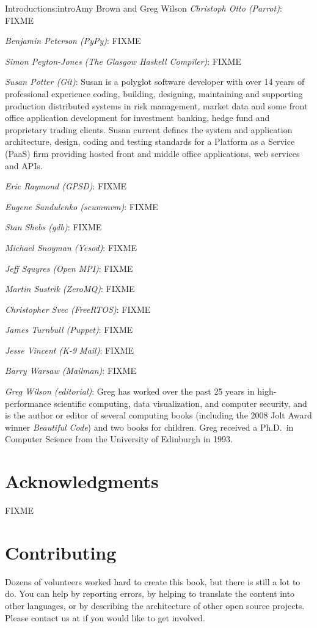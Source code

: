 \begin{aosachapter}{Introduction}{s:intro}{Amy Brown and Greg Wilson}
\emph{Christoph Otto (Parrot)}: FIXME

\emph{Benjamin Peterson (PyPy)}: FIXME

\emph{Simon Peyton-Jones (The Glasgow Haskell Compiler)}: FIXME

\emph{Susan Potter (Git)}: Susan is a polyglot software developer with
over 14 years of professional experience coding, building, designing,
maintaining and supporting production distributed systems in risk management,
market data and some front office application development for investment
banking, hedge fund and proprietary trading clients. Susan current defines the
system and application architecture, design, coding and testing standards for
a Platform as a Service (PaaS) firm providing hosted front and middle office
applications, web services and APIs.

\emph{Eric Raymond (GPSD)}: FIXME

\emph{Eugene Sandulenko (scummvm)}: FIXME

\emph{Stan Shebs (gdb)}: FIXME

\emph{Michael Snoyman (Yesod)}: FIXME

\emph{Jeff Squyres (Open MPI)}: FIXME

\emph{Martin Sustrik (ZeroMQ)}: FIXME

\emph{Christopher Svec (FreeRTOS)}: FIXME

\emph{James Turnbull (Puppet)}: FIXME

\emph{Jesse Vincent (K-9 Mail)}: FIXME

\emph{Barry Warsaw (Mailman)}: FIXME

\emph{Greg Wilson (editorial)}: Greg has worked over the past 25 years
in high-performance scientific computing, data visualization, and
computer security, and is the author or editor of several computing
books (including the 2008 Jolt Award winner \emph{Beautiful Code}) and
two books for children.  Greg received a Ph.D.\ in Computer Science
from the University of Edinburgh in 1993.

\section*{Acknowledgments}

FIXME

\section*{Contributing}

Dozens of volunteers worked hard to create this book, but there is
still a lot to do.  You can help by reporting errors, by helping to
translate the content into other languages, or by describing the
architecture of other open source projects.  Please contact us at
 if you would like to get involved.

\end{aosachapter}
